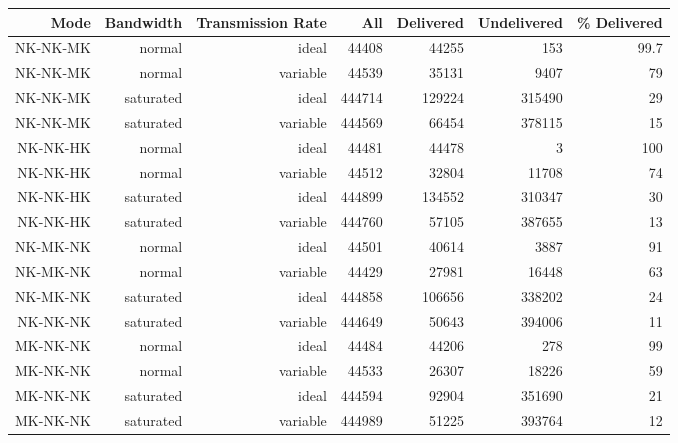 \begin{landscape}
\begin{table}[htbp]
    \begin{tabular}{rrrrrrr}

    \toprule
    Mode  & Bandwidth & Transmission Rate & All   & Delivered & Undelivered & \% Delivered \\
    \midrule
\rowcolor{Gray}    
    NK-NK-MK & normal & ideal & 44408 & 44255 & 153   & 99.7 \\
\rowcolor{Gray}
    NK-NK-MK & normal & variable & 44539 & 35131 & 9407  & 79 \\
\rowcolor{Gray}
    NK-NK-MK & saturated & ideal & 444714 & 129224 & 315490 & 29 \\
\rowcolor{Gray}
    NK-NK-MK & saturated & variable & 444569 & 66454 & 378115 & 15 \\
    NK-NK-HK & normal & ideal & 44481 & 44478 & 3     & 100 \\
    NK-NK-HK & normal & variable & 44512 & 32804 & 11708 & 74 \\
    NK-NK-HK & saturated & ideal & 444899 & 134552 & 310347 & 30 \\
    NK-NK-HK & saturated & variable & 444760 & 57105 & 387655 & 13 \\
\rowcolor{Gray}
    NK-MK-NK & normal & ideal & 44501 & 40614 & 3887  & 91 \\
\rowcolor{Gray}
    NK-MK-NK & normal & variable & 44429 & 27981 & 16448 & 63 \\
\rowcolor{Gray}
    NK-MK-NK & saturated & ideal & 444858 & 106656 & 338202 & 24 \\
\rowcolor{Gray}
    NK-NK-NK & saturated & variable & 444649 & 50643 & 394006 & 11 \\
    MK-NK-NK & normal & ideal & 44484 & 44206 & 278   & 99 \\
    MK-NK-NK & normal & variable & 44533 & 26307 & 18226 & 59 \\
    MK-NK-NK & saturated & ideal & 444594 & 92904 & 351690 & 21 \\
    MK-NK-NK & saturated & variable & 444989 & 51225 & 393764 & 12 \\

\end{tabular}
\end{table}
\end{landscape}
